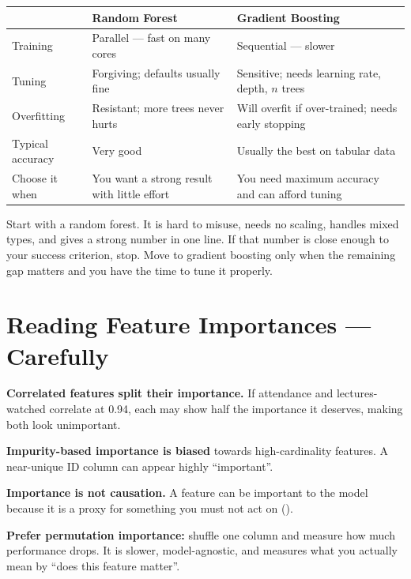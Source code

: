 \begin{longtable}{@{}L{3.3cm}L{5.3cm}L{5.9cm}@{}}
\toprule
{}
& \textbf{Random Forest} & \textbf{Gradient Boosting} \\
\midrule
\endhead
Training & Parallel --- fast on many cores & Sequential --- slower \\
Tuning & Forgiving; defaults usually fine & Sensitive; needs learning rate, depth, $n$ trees \\
Overfitting & Resistant; more trees never hurts & Will overfit if over-trained; needs early stopping \\
Typical accuracy & Very good & Usually the best on tabular data \\
Choose it when & You want a strong result with little effort & You need maximum accuracy and can afford tuning \\
\bottomrule
\end{longtable}

\begin{conceptbox}
Start with a random forest. It is hard to misuse, needs no scaling, handles mixed
types, and gives a strong number in one line. If that number is close enough to
your success criterion, stop. Move to gradient boosting only when the remaining gap
matters and you have the time to tune it properly.
\end{conceptbox}

\section{Reading Feature Importances --- Carefully}

\begin{alertbox}
\begin{tight}
  \item \textbf{Correlated features split their importance.} If attendance and
        lectures-watched correlate at 0.94, each may show half the importance it
        deserves, making both look unimportant.
  \item \textbf{Impurity-based importance is biased} towards high-cardinality
        features. A near-unique ID column can appear highly ``important''.
  \item \textbf{Importance is not causation.} A feature can be important to the
        model because it is a proxy for something you must not act on
        ().
\end{tight}
\textbf{Prefer permutation importance:} shuffle one column and measure how much
performance drops. It is slower, model-agnostic, and measures what you actually
mean by ``does this feature matter''.
\end{alertbox}

